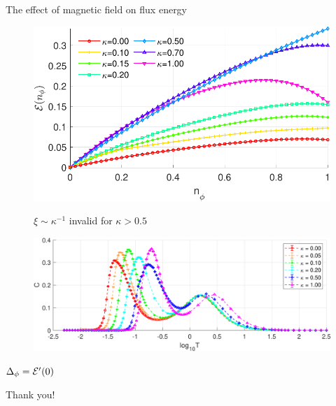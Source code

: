 \begin{frame}{The effect of magnetic field on flux energy}
    \begin{figure}
        \begin{minipage}[l]{.45\textwidth}
            \includegraphics[width = 1\textwidth]{figures/band_extrapolation.pdf}
        \end{minipage}
        \begin{minipage}[t]{.35\textwidth}
            \footnotesize
            \hspace{0.5cm}$\xi\sim\kappa^{-1}$ invalid for $\kappa>0.5$
        \end{minipage}
        
        \begin{minipage}[c]{.7\textwidth}
            \includegraphics[width = 1\textwidth]{figures/Cv_10_10.pdf}
        \end{minipage}
    \end{figure}
    \centering \small $\Delta_\phi = \mathcal{E}'(0)$
\end{frame}


\begin{frame}
\large
\centerline{Thank you!}
\end{frame}